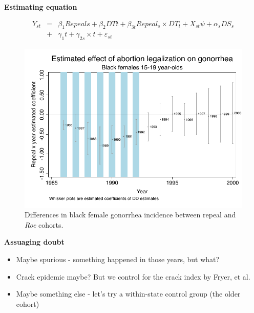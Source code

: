 \documentclass[notes=show]{beamer}
\begin{document}
\begin{frame}[plain]
\begin{center}
\textbf{Estimating equation}
\end{center}

\begin{eqnarray*}
Y_{st} &=& \beta_1Repeals +\beta_2 DTt +\beta_{3t} Repeal_s \times DT_t +X_{st} \psi+\alpha_{s}DS_s \\
&+&  \gamma_1t + \gamma_{2s} \times t + \varepsilon_{st}
\end{eqnarray*}

\end{frame}

\begin{frame}[plain]

\begin{figure}
	\includegraphics[scale=0.75]{./lecture_includes/bf15_dd.pdf}
	\caption{Differences in black female gonorrhea incidence between repeal and \emph{Roe} cohorts.}
	\end{figure}

\end{frame}

\begin{frame}[plain]
\begin{center}
\textbf{Assuaging doubt}
\end{center}

\begin{itemize}

\item Maybe spurious - something happened in those years, but what?
\item Crack epidemic maybe? But we control for the crack index by Fryer, et al.
\item Maybe something else - let's try a within-state control group (the older cohort)

\end{itemize}

\end{frame}
\end{document}
